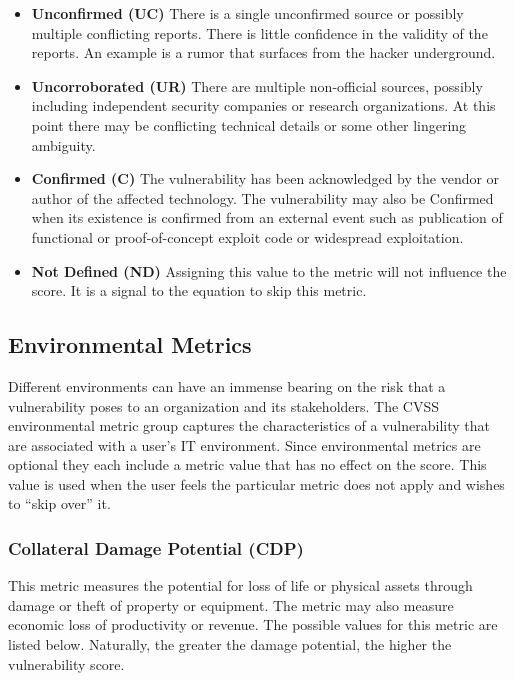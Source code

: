     \begin{itemize}
      \item
        \textbf{Unconfirmed (UC)} There is a single unconfirmed source or
        possibly multiple conflicting reports. There is little confidence in
        the validity of the reports. An example is a rumor that surfaces from
        the hacker underground.
      \item
        \textbf{Uncorroborated (UR)} There are multiple non-official sources,
        possibly including independent security companies or research
        organizations. At this point there may be conflicting technical
        details or some other lingering ambiguity.
      \item
        \textbf{Confirmed (C)} The vulnerability has been acknowledged by the
        vendor or author of the affected technology. The vulnerability may
        also be Confirmed when its existence is confirmed from an external
        event such as publication of functional or proof-of-concept exploit
        code or widespread exploitation.
      \item
        \textbf{Not Defined (ND)} Assigning this value to the metric will not
        influence the score. It is a signal to the equation to skip this
        metric.
    \end{itemize}

    \subsection{Environmental Metrics}\label{subsec:environmental-metrics}

    Different environments can have an immense bearing on the risk that a
    vulnerability poses to an organization and its stakeholders. The CVSS
    environmental metric group captures the characteristics of a
    vulnerability that are associated with a user's IT environment. Since
    environmental metrics are optional they each include a metric value that
    has no effect on the score. This value is used when the user feels the
    particular metric does not apply and wishes to ``skip over'' it.

    \subsubsection{Collateral Damage Potential
    (CDP)}\label{subsec:collateral-damage-potential-cdp}

    This metric measures the potential for loss of life or physical assets
    through damage or theft of property or equipment. The metric may also
    measure economic loss of productivity or revenue. The possible values
    for this metric are listed below. Naturally, the greater the
    damage potential, the higher the vulnerability score.

